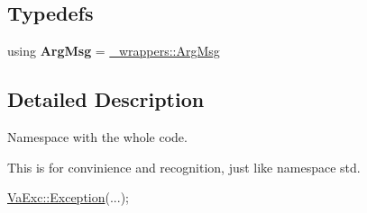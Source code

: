 \subsection*{Typedefs}
\begin{DoxyCompactItemize}
\item 
\mbox{\label{namespace_va_exc_a701cd5c31db8455b42b16c5226b1e456}} 
using {\bfseries Arg\+Msg} = \hyperlink{struct_va_exc_1_1__wrappers_1_1_arg_msg}{\+\_\+wrappers\+::\+Arg\+Msg}
\end{DoxyCompactItemize}


\subsection{Detailed Description}
Namespace with the whole code. 

This is for convinience and recognition, just like namespace std.


\begin{DoxyCode}
\hyperlink{class_va_exc_1_1_exception}{VaExc::Exception}(...);
\end{DoxyCode}
 